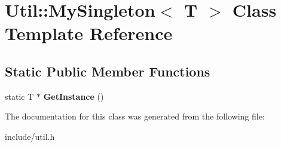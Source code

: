 \hypertarget{class_util_1_1_my_singleton}{}\section{Util\+:\+:My\+Singleton$<$ T $>$ Class Template Reference}
\label{class_util_1_1_my_singleton}
\subsection*{Static Public Member Functions}
\begin{DoxyCompactItemize}
\item 
\hypertarget{class_util_1_1_my_singleton_a7786ec28b1e4608316a2564e0f4d72e3}{}static T $\ast$ {\bfseries Get\+Instance} ()\label{class_util_1_1_my_singleton_a7786ec28b1e4608316a2564e0f4d72e3}

\end{DoxyCompactItemize}


The documentation for this class was generated from the following file\+:\begin{DoxyCompactItemize}
\item 
include/util.\+h\end{DoxyCompactItemize}
